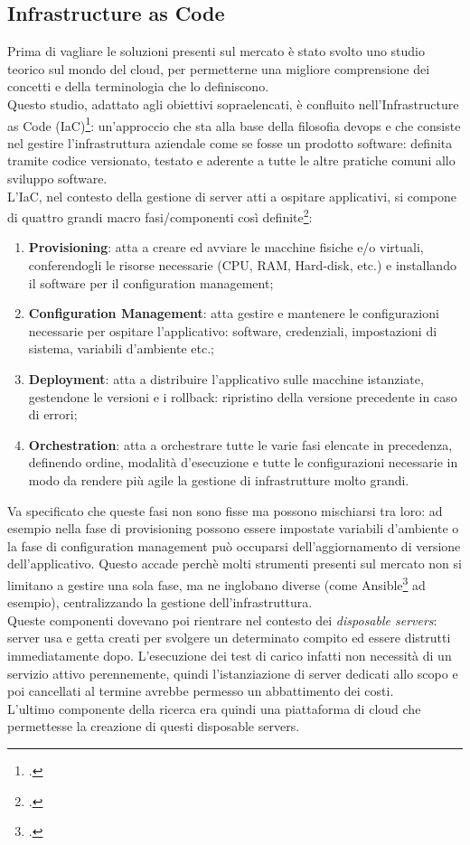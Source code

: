 \subsection{Infrastructure as Code}
Prima di vagliare le soluzioni presenti sul mercato è stato svolto uno studio teorico sul mondo del \gls{cloud}, per permetterne una migliore comprensione dei concetti e della terminologia che lo definiscono. \\
Questo studio, adattato agli obiettivi sopraelencati, è confluito nell'Infrastructure as Code (IaC)\footcite{article:iac}: un'approccio che sta alla base della filosofia \gls{devops} e che consiste nel gestire l'infrastruttura aziendale come se fosse un prodotto software: definita tramite codice versionato, testato e aderente a tutte le altre pratiche comuni allo sviluppo software. \\
L'IaC, nel contesto della gestione di server atti a ospitare applicativi, si compone di quattro grandi macro fasi/componenti così definite\footcite{article:iac-components}:
\begin{enumerate}
	\item \textbf{Provisioning}: atta a creare ed avviare le macchine fisiche e/o virtuali, conferendogli le risorse necessarie (CPU, RAM, Hard-disk, etc.) e installando il software per il configuration management;
	\item \textbf{Configuration Management}: atta gestire e mantenere le configurazioni necessarie per ospitare l'applicativo: software, credenziali, impostazioni di sistema, variabili d'ambiente etc.;
	\item \textbf{Deployment}: atta a distribuire l'applicativo sulle macchine istanziate, gestendone le versioni e i rollback: ripristino della versione precedente in caso di errori;
	\item \textbf{Orchestration}: atta a orchestrare tutte le varie fasi elencate in precedenza, definendo ordine, modalità d'esecuzione e tutte le configurazioni necessarie in modo da rendere più agile la gestione di infrastrutture molto grandi.
\end{enumerate}
Va specificato che queste fasi non sono fisse ma possono mischiarsi tra loro: ad esempio nella fase di provisioning possono essere impostate variabili d'ambiente o la fase di configuration management può occuparsi dell'aggiornamento di versione dell'applicativo. Questo accade perchè molti strumenti presenti sul mercato non si limitano a gestire una sola fase, ma ne inglobano diverse (come Ansible\footcite{site:ansible} ad esempio), centralizzando la gestione dell'infrastruttura. \\
Queste componenti dovevano poi rientrare nel contesto dei \textit{disposable servers}: server usa e getta creati per svolgere un determinato compito ed essere distrutti immediatamente dopo. L'esecuzione dei test di carico infatti non necessità di un servizio attivo perennemente, quindi l'istanziazione di server dedicati allo scopo e poi cancellati al termine avrebbe permesso un abbattimento dei costi. \\
L'ultimo componente della ricerca era quindi una piattaforma di \gls{cloud} che permettesse la creazione di questi disposable servers.
